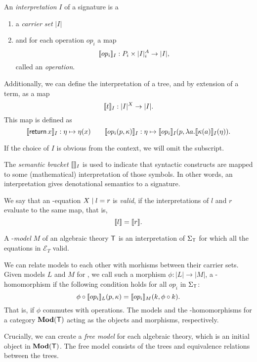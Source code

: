 \begin{definition}[Interpretation]
    An \emph{interpretation} $I$ of a signature \Sig is a
    \begin{enumerate}
    \item a \emph{carrier set} $|I|$
    \item and for each operation $op_i$ a map
        \[ \llbracket op_i\rrbracket_I : P_i \times |I|^A_i \to |I|, \]
        called an \emph{operation}.
    \end{enumerate}
    Additionally, we can define the interpretation of a tree, and by extension of a term, as a map
    \[ \llbracket t\rrbracket_I : |I|^X \to |I|. \]
    This map is defined as
    \[
        \llbracket\operatorname{\mathsf{return}} x\rrbracket_I : \eta \mapsto \eta(x)
        \qquad
        \llbracket op_i(p,\kappa)\rrbracket_I : \eta \mapsto \llbracket op_i\rrbracket_I(p, \lambda a. \llbracket\kappa(a)\rrbracket_I(\eta)).
    \]
\end{definition}

If the choice of $I$ is obvious from the context, we will omit the subscript.

The \emph{semantic bracket} $\llbracket\rrbracket_I$ is used to indicate that syntactic constructs are mapped to some (mathematical) interpretation of those symbols. In other words, an interpretation gives denotational semantics to a signature.

\begin{definition}[Model]
    We say that an \Sig-equation $X \;|\; l = r$ is \emph{valid}, if the interpretations of $l$ and $r$ evaluate to the same map, that is,
    \[ \llbracket l\rrbracket = \llbracket r\rrbracket. \]

    A \T-\emph{model} $M$ of an algebraic theory $\mathsf{T}$ is an interpretation of $\Sigma_\mathsf{T}$ for which all the equations in $\mathcal{E}_T$ valid.
\end{definition}

We can relate models to each other with morhisms between their carrier sets. Given models $L$ and $M$ for \T, we call such a morphism $\phi : |L| \to |M|$, a \T-homomorphism if the following condition holds for all $op_i$ in $\Sigma_\mathsf{T}$:
\[ \phi \circ \llbracket op_i\rrbracket_L(p, \kappa) = \llbracket op_i\rrbracket_M(k, \phi \circ k). \]
That is, if $\phi$ commutes with operations. The models and the \T-homomorphisms for a category $\mathbf{Mod}(\mathsf{T})$ acting as the objects and morphisms, respectively.

Crucially, we can create a \emph{free model} for each algebraic theory, which is an initial object in $\mathbf{Mod}(\mathsf{T})$. The free model consists of the trees and equivalence relations between the trees.

